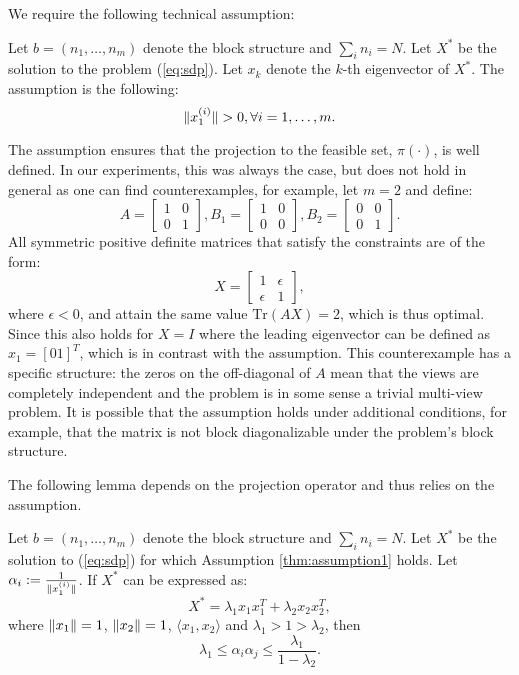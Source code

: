 We require the following technical assumption:
\begin{assumption}\label{thm:assumption1}
Let $b = \left(n_1,\ldots,n_m\right)$ denote the block structure and $ \sum_i n_i = N $.
Let $X^*$ be the solution to the problem (\ref{eq:sdp}). Let $x_k$ denote the $k$-th
eigenvector of $X^*$. The assumption is the following:
$$\lVert x_1^{(i)}\rVert > 0, \forall i = 1,\ldots, m.$$
\end{assumption}

\begin{remark} The assumption ensures that the projection to the feasible set,
$\pi(\cdot)$, is well defined. In our experiments, this was always
the case, but does not hold in general as one can find counterexamples, for example, let $m = 2$ and define:
$$
A = \begin{bmatrix}
  1 & 0 \\
  0 & 1
 \end{bmatrix},
B_1 = \begin{bmatrix}
  1 & 0 \\
  0 & 0
 \end{bmatrix},
B_2 = \begin{bmatrix}
  0 & 0 \\
  0 & 1
 \end{bmatrix}.
$$
All symmetric positive definite matrices that satisfy the constraints are of the form:
$$
X = \begin{bmatrix}
  1 & \epsilon \\
  \epsilon & 1
  \end{bmatrix},
$$ where $\epsilon < 0$, and attain the same value $\mathrm{Tr}\left(A X \right) = 2$, which is thus optimal.
Since this also holds for $X = I$ where the leading eigenvector can be defined as $x_1 = [0 1]^T$, which is in
contrast with the assumption. This counterexample has a specific structure: the zeros on the off-diagonal of $A$
mean that the views are completely independent and the problem is in some sense a trivial multi-view problem.
It is possible that the assumption holds under additional conditions, for example, that the
matrix is not block diagonalizable under the problem's block structure. 
  
\end{remark}


The following lemma depends on the projection
operator and thus relies on the assumption.

\begin{lemma}
Let $b = \left(n_1,\ldots,n_m\right)$ denote the block structure and $ \sum_i n_i = N $.
Let $X^*$ be the solution to (\ref{eq:sdp}) for which Assumption \ref{thm:assumption1} holds.
Let $\alpha_i := \frac{1}{\lVert x_1^{(i)}\rVert}$.
If $X^*$ can be expressed as:
$$X^* = \lambda_1  x_1 x_1^T + \lambda_2 x_2 x_2^T,$$
where $\lVert x_1\rVert=1$, $\lVert x_2\rVert=1$, $\langle x_1, x_2 \rangle$ and $\lambda_1 > 1 >  \lambda_2$, then
$$\lambda_1 \leq \alpha_i \alpha_j  \leq \frac{\lambda_1}{1 - \lambda_2}.$$
\end{lemma}

